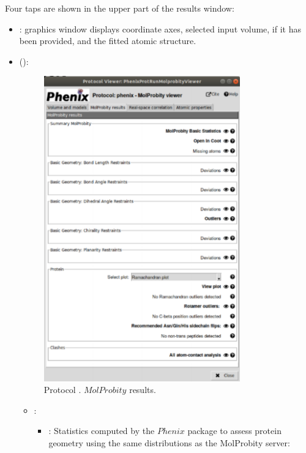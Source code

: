 \begin{itemize}
   Four taps are shown in the upper part of the results window:
   \begin{itemize}
     \item {}:
     \chimera graphics window displays coordinate axes, selected input volume, if it has been provided, and the fitted atomic structure.
     \item {} ():
        \begin{figure}[H]
         \centering 
         \captionsetup{width=.7\linewidth} 
         \includegraphics[width=0.80\textwidth]{Images_appendix/Fig145.pdf}
         \caption{Protocol . $MolProbity$ results.}
         \label{fig:app_protocol_molprobity_3}
        \end{figure}
        
        \begin{itemize}
         \item {}: 
          \begin{itemize}
           \item {}: Statistics computed by the $Phenix$ package to assess protein geometry using the same distributions as the MolProbity server:\setlength{\parindent}{12pt}\\
           

\end{itemize}
\end{itemize}
\end{itemize}
\end{itemize}
